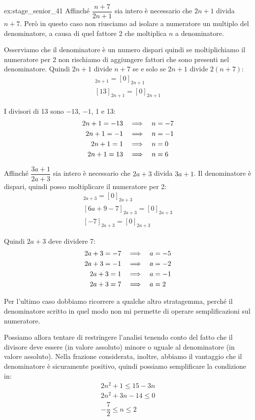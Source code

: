 \begin{soluzione}{ex:stage_senior_41}
    Affinché $\dfrac{n + 7}{2n + 1}$ sia intero è necessario che $2n+1$ divida $n+7$.
    Però in questo caso non riusciamo ad isolare a numeratore un multiplo del denominatore, a causa di quel fattore 2
    che moltiplica $n$ a denominatore.

    Osserviamo che il denominatore è un numero dispari quindi se moltiplichiamo il numeratore per 2 non rischiamo
    di aggiungere fattori che sono presenti nel denominatore.
    Quindi $2n+1$ divide $n+7$ se e solo se $2n+1$ divide $2(n+7)$:
    \begin{gather*}
        [2n +14]_{2n+1} = [0]_{2n + 1} \\
        [13]_{2n + 1} = [0]_{2n + 1}
    \end{gather*}

    I divisori di 13 sono $-13$, $-1$, 1 e 13:
    \begin{align*}
        2n + 1 = -13 & \quad\Longrightarrow\quad  n = -7 \\
        2n + 1 = -1 & \quad\Longrightarrow\quad  n = -1 \\
        2n + 1 = 1 & \quad\Longrightarrow\quad  n = 0 \\
        2n + 1 = 13 & \quad\Longrightarrow\quad  n = 6
    \end{align*}

    Affinché $\dfrac{3a + 1}{2a + 3}$ sia intero è necessario che $2a+3$ divida $3a+1$.
    Il denominatore è dispari, quindi posso moltiplicare il numeratore per 2:
    \begin{gather*}
        [6a + 2]_{2a + 3} = [0]_{2a + 3} \\
        [6a + 9 - 7]_{2a + 3} = [0]_{2a+3} \\
        [-7]_{2a + 3} = [0]_{2a+3}
    \end{gather*}

    Quindi $2a + 3$ deve dividere 7:
    \begin{align*}
        2a + 3 = -7 & \quad\Longrightarrow\quad  a = -5 \\
        2a + 3 = -1 & \quad\Longrightarrow\quad  a = -2 \\
        2a + 3 = 1 & \quad\Longrightarrow\quad  a = -1 \\
        2a + 3 = 7 & \quad\Longrightarrow\quad  a = 2
    \end{align*}

    Per l'ultimo caso dobbiamo ricorrere a qualche altro stratagemma, perché il denominatore scritto in quel modo
    non mi permette di operare semplificazioni sul numeratore.

    Possiamo allora tentare di restringere l'analisi tenendo conto del fatto che il divisore deve essere (in valore
    assoluto) minore o uguale al denominatore (in valore assoluto).
    Nella frazione considerata, inoltre, abbiamo il vantaggio che il denominatore è sicuramente positivo, quindi
    possiamo semplificare la condizione in:
    \begin{gather*}
        2n^2 + 1 \le 15 - 3n \\
        2n^2 + 3n - 14 \le 0 \\
        -\dfrac{7}{2} \le n \le 2
    \end{gather*}


\end{soluzione}
